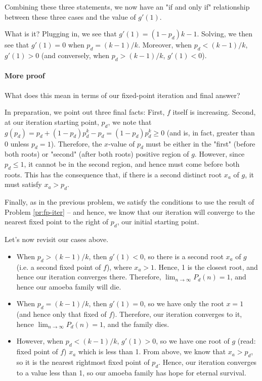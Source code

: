 
Combining these three statements, we now have an "if and only if" relationship between these three cases and the value of $g'(1)$. 

What is it? Plugging in, we see that $g'(1) = (1 - p_d)k - 1$. Solving, we then see that $g'(1) = 0$ when $p_d = (k-1)/k$. Moreover, when $p_d < (k-1)/k$, $g'(1) > 0$ (and conversely, when $p_d > (k-1)/k$, $g'(1) < 0$). 

\paragraph{More proof}

What does this mean in terms of our fixed-point iteration and final answer?

In preparation, we point out three final facts: First, $f$ itself is increasing. Second, at our iteration starting point, $p_d$, we note that $g(p_d) = p_d + (1 - p_d)p_d^k - p_d = (1 - p_d)p_d^k \geq 0$ (and is, in fact, greater than 0 unless $p_d = 1$). Therefore, the $x$-value of $p_d$ must be either in the "first" (before both roots) or "second" (after both roots) positive region of $g$. However, since $p_d \leq 1$, it cannot be in the second region, and hence must come before both roots. This has the consequence that, if there is a second distinct root $x_a$ of $g$, it must satisfy $x_a > p_d$. 


Finally, as in the previous problem, we satisfy the conditions to use the result of Problem \ref{pr:fp-iter} -- and hence, we know that our iteration will converge to the nearest fixed point to the right of $p_d$, our initial starting point.

Let's now revisit our cases above. 

\begin{itemize}
\item When $p_d > (k-1)/k$, then $g'(1) < 0$, so there is a second root $x_a$ of $g$ (i.e. a second fixed point of $f$), where $x_a > 1$. Hence, 1 is the closest root, and hence our iteration converges there. Therefore, $\lim_{n \rightarrow \infty} P_d(n) = 1$, and hence our amoeba family will die. 
\item When $p_d = (k-1)/k$, then $g'(1) = 0$, so we have only the root $x = 1$ (and hence only that fixed of $f$). Therefore, our iteration converges to it, hence $\lim_{n \rightarrow \infty} P_d(n) = 1$, and the family dies.
\item However, when $p_d < (k-1)/k$, $g'(1) > 0$, so we have one root of $g$ (read: fixed point of $f$) $x_a$ which is less than 1. From above, we know that $x_a > p_d$, so it is the nearest rightmost fixed point of $p_d$. Hence, our iteration converges to a value less than 1, so our amoeba family has hope for eternal survival. 
\end{itemize}

